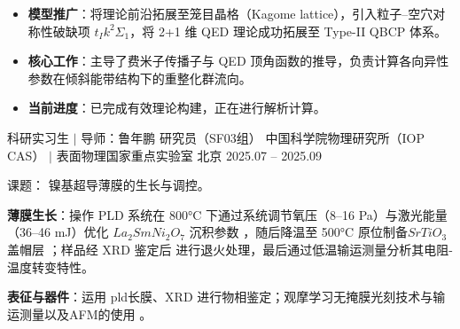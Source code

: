 \begin{cventries}
{\begin{cvitems}
        \item[] 
          \begin{itemize}
            \item {\textbf{模型推广}：将理论前沿拓展至笼目晶格（Kagome lattice），引入粒子--空穴对称性破缺项 $t_{I}k^{2}\Sigma_{1}$，将 2+1 维 QED 理论成功拓展至 Type-II QBCP 体系。}
            \item {\textbf{核心工作}：主导了费米子传播子与 QED 顶角函数的推导，负责计算各向异性参数在倾斜能带结构下的重整化群流向。}
            \item {\textbf{当前进度}：已完成有效理论构建，正在进行解析计算。}
          \end{itemize}
      \end{cvitems}
    }

\vspace{1em}

  \cventry
    {科研实习生 $|$ 导师：鲁年鹏 研究员（SF03组）} 
    {中国科学院物理研究所（IOP CAS） $|$ 表面物理国家重点实验室} 
    {北京} 
    {2025.07 -- 2025.09} 
    {
      \begin{cvitems}
        \item {课题： 镍基超导薄膜的生长与调控。}
        \item {\textbf{薄膜生长}：操作 PLD 系统在 800°C 下通过系统调节氧压（8--16 Pa）与激光能量（36--46 mJ）优化 $La_2SmNi_2O_7$ 沉积参数 ，随后降温至 500°C 原位制备$SrTiO_3$ 盖帽层 ；样品经 XRD 鉴定后 进行退火处理，最后通过低温输运测量分析其电阻-温度转变特性。}
        \item {\textbf{表征与器件}：运用 pld长膜、XRD 进行物相鉴定；观摩学习无掩膜光刻技术与输运测量以及AFM的使用 。}
      \end{cvitems}
    }

\end{cventries}
